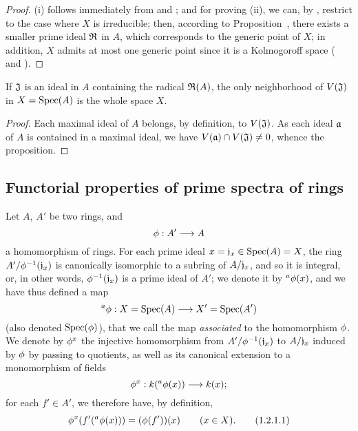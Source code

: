 \begin{proof}
\label{proof-1.1.1.14}
(i) follows immediately from  and ;
and for proving (ii), we can, by , restrict to the case where $X$ is irreducible;
then, according to Proposition~, there exists a smaller prime ideal $\mathfrak{R}$ in $A$, which corresponds to the generic point
of $X$;
in addition, $X$ admits at most one generic point since it is a Kolmogoroff space ( and ).
\end{proof}

\begin{prop}[1.1.15]
\label{1.1.1.15}
If $\mathfrak{J}$ is an ideal in $A$ containing the radical $\mathfrak{R}(A)$, the only
neighborhood of $V(\mathfrak{J})$ in $X={\mathop{\mathrm{Spec}}\nolimits}(A)$ is the whole space $X$.
\end{prop}

\begin{proof}
\label{proof-1.1.1.15}
Each maximal ideal of $A$ belongs, by definition, to $V(\mathfrak{J})$.
As each ideal $\mathfrak{a}$ of $A$ is contained in a maximal ideal, we have $V(\mathfrak{a})\cap V(\mathfrak{J})\neq 0$, whence the proposition.
\end{proof}

\subsection{Functorial properties of prime spectra of rings}
\label{subsection:func-prop}

\begin{env}[1.2.1]
\label{1.1.2.1}
Let $A$, $A'$ be two rings, and
\[
  \vphi:A'\to A
\]
a homomorphism of rings.
For each prime ideal $x=\mathfrak{j}_x\in{\mathop{\mathrm{Spec}}\nolimits}(A)=X$, the ring $A'/\phi^{-1}(\mathfrak{j}_x)$ is canonically isomorphic to a subring of $A/\mathfrak{j}_x$, and so it is integral, or, in other words, $\phi^{-1}(\mathfrak{j}_x)$ is a prime ideal of $A'$;
we denote it by ${}^a\phi(x)$, and we have thus defined a map
\[
  {}^a\vphi:X=\Spec(A)\to X'=\Spec(A')
\]
(also denoted ${\mathop{\mathrm{Spec}}\nolimits}(\phi)$), that we call the map \emph{associated} to the homomorphism $\phi$.
We denote by $\phi^x$ the injective homomorphism from $A'/\phi^{-1}(\mathfrak{j}_x)$ to $A/\mathfrak{j}_x$ induced by $\phi$ by passing to quotients, as well as its canonical extension to a monomorphism of fields
\[
  \vphi^x:\kres({}^a\vphi(x))\to\kres(x);
\]
for each $f'\in A'$, we therefore have, by definition,
\[
  \phi^x(f'({}^a\phi(x)))=(\phi(f'))(x)\qquad(x\in X).
  \tag{1.2.1.1}
\]
\end{env}


